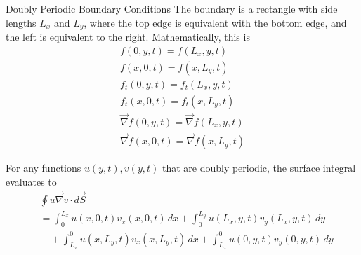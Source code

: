 \documentclass[12pt]{article}
\begin{document}
\newpage
\begin{section}{Doubly Periodic Boundary Conditions}
    The boundary is a rectangle with side lengths $L_x$ and $L_y$, where the top edge is equivalent with the bottom edge, and the left is equivalent to the right. Mathematically, this is
    \begin{align*}
        f(0,y,t) = f(L_x,y,t) \\
        f(x,0,t) = f(x,L_y,t) \\
        f_t(0,y,t) = f_t(L_x,y,t) \\
        f_t(x,0,t) = f_t(x,L_y,t) \\
        \vec\nabla f(0,y,t) = \vec\nabla f(L_x,y,t) \\
        \vec\nabla f(x,0,t) = \vec\nabla f(x,L_y,t)
    \end{align*}

    For any functions $u(y,t), v(y,t)$ that are doubly periodic, the surface integral evaluates to
    \begin{align*}
        &\oint u \vec\nabla v \cdot d\vec S \\
        &= \int_0^{L_x} u(x,0,t)v_x(x,0,t) \, dx + \int_0^{L_y} u(L_x,y,t)v_y(L_x,y,t) \, dy \\
        &\quad + \int_{L_x}^0 u(x,L_y,t)v_x(x,L_y,t) \, dx + \int_{L_x}^0 u(0,y,t)v_y(0,y,t) \, dy
    \end{align*}
\end{section}
\end{document}
